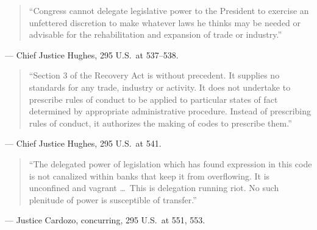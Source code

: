 \documentclass[12pt]{article}
\begin{document}
\begin{quote}
``Congress cannot delegate legislative power to the President to exercise an unfettered discretion to make whatever laws he thinks may be needed or advisable for the rehabilitation and expansion of trade or industry.''
\end{quote}
\noindent --- Chief Justice Hughes, 295 U.S.\ at 537--538.

\begin{quote}
``Section 3 of the Recovery Act is without precedent. It supplies no standards for any trade, industry or activity. It does not undertake to prescribe rules of conduct to be applied to particular states of fact determined by appropriate administrative procedure. Instead of prescribing rules of conduct, it authorizes the making of codes to prescribe them.''
\end{quote}
\noindent --- Chief Justice Hughes, 295 U.S.\ at 541.

\begin{quote}
``The delegated power of legislation which has found expression in this code is not canalized within banks that keep it from overflowing. It is unconfined and vagrant \dots\ This is delegation running riot. No such plenitude of power is susceptible of transfer.''
\end{quote}
\noindent --- Justice Cardozo, concurring, 295 U.S.\ at 551, 553.
\end{document}
